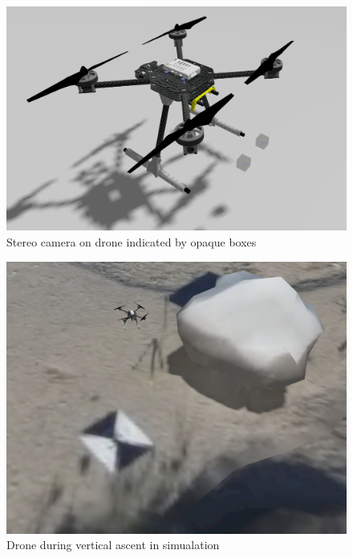 \begin{figure}
    \centering
    \includegraphics[scale=0.32]{images/preparation/stereo/drone_with_stereo_cam.png}
    \caption{Stereo camera on drone indicated by opaque boxes}
\end{figure}

\begin{figure}
    \centering
    \includegraphics[scale=0.34]{images/preparation/stereo/ascent_sim.png}
    \caption{Drone during vertical ascent in simualation}
\end{figure}


